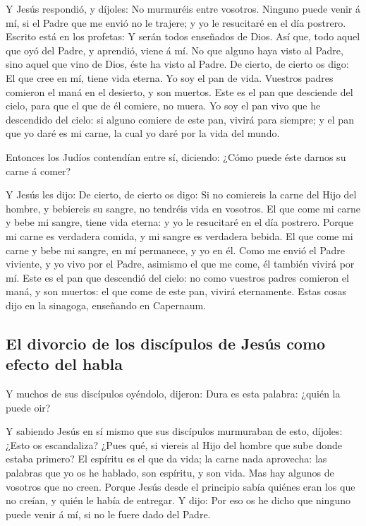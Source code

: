  Y Jesús respondió, y díjoles: No murmuréis entre vosotros.
 Ninguno puede venir á mí, si el Padre que me envió no le
trajere; y yo le resucitaré en el día postrero.  Escrito
está en los profetas: Y serán todos enseñados de Dios. Así que, todo
aquel que oyó del Padre, y aprendió, viene á mí.  No que
alguno haya visto al Padre, sino aquel que vino de Dios, éste ha visto
al Padre.  De cierto, de cierto os digo: El que cree en mí,
tiene vida eterna.  Yo soy el pan de vida. 
Vuestros padres comieron el maná en el desierto, y son muertos.
 Este es el pan que desciende del cielo, para que el que de
él comiere, no muera.  Yo soy el pan vivo que he descendido
del cielo: si alguno comiere de este pan, vivirá para siempre; y el pan
que yo daré es mi carne, la cual yo daré por la vida del mundo.

 Entonces los Judíos contendían entre sí, diciendo: ¿Cómo
puede éste darnos su carne á comer?

 Y Jesús les dijo: De cierto, de cierto os digo: Si no
comiereis la carne del Hijo del hombre, y bebiereis su sangre, no
tendréis vida en vosotros.  El que come mi carne y bebe mi
sangre, tiene vida eterna: y yo le resucitaré en el día postrero.
 Porque mi carne es verdadera comida, y mi sangre es
verdadera bebida.  El que come mi carne y bebe mi sangre,
en mí permanece, y yo en él.  Como me envió el Padre
viviente, y yo vivo por el Padre, asimismo el que me come, él también
vivirá por mí.  Este es el pan que descendió del cielo: no
como vuestros padres comieron el maná, y son muertos: el que come de
este pan, vivirá eternamente.  Estas cosas dijo en la
sinagoga, enseñando en Capernaum.

\hypertarget{el-divorcio-de-los-discuxedpulos-de-jesuxfas-como-efecto-del-habla}{%
\subsection{El divorcio de los discípulos de Jesús como efecto del
habla}\label{el-divorcio-de-los-discuxedpulos-de-jesuxfas-como-efecto-del-habla}}

 Y muchos de sus discípulos oyéndolo, dijeron: Dura es esta
palabra: ¿quién la puede oir?

 Y sabiendo Jesús en sí mismo que sus discípulos murmuraban
de esto, díjoles: ¿Esto os escandaliza?  ¿Pues qué, si
viereis al Hijo del hombre que sube donde estaba primero? 
El espíritu es el que da vida; la carne nada aprovecha: las palabras que
yo os he hablado, son espíritu, y son vida.  Mas hay
algunos de vosotros que no creen. Porque Jesús desde el principio sabía
quiénes eran los que no creían, y quién le había de entregar.
 Y dijo: Por eso os he dicho que ninguno puede venir á mí,
si no le fuere dado del Padre.

